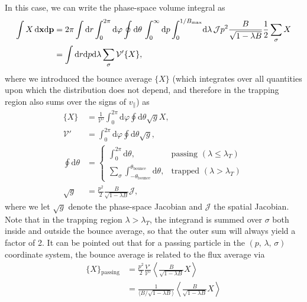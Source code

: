 \documentclass[11pt,a4paper]{article}
\newcommand{\rd}{\ensuremath{\mathrm{d}}}
\newcommand{\sub}[1]{\ensuremath{_{\text{#1}}}}
\renewcommand{\b}[1]{\ensuremath{ {\bf #1 } }}
\begin{document}
In this case, we can write the phase-space volume integral as
\begin{align}
\int X \,\rd\b{x} \rd\b{p} &= 2\pi \int \rd r \int_0^{2\pi} \rd \varphi \oint \rd \theta \, \int_0^\infty \rd p \int_0^{1/B\sub{max}} \!\rd \lambda \, \mathcal{J}p^2\frac{B}{\sqrt{1-\lambda B}}\frac{1}{2}\sum_\sigma X \nonumber \\
&= \int \rd r \rd p \rd \lambda \sum_\sigma \mathcal{V}' \{ X \},
\end{align}
where we introduced the bounce average $\{X\}$ (which integrates over all quantities upon which the distribution does not depend, and therefore in the trapping region also sums over the signs of $v_\parallel$) as
\begin{align}
\{ X\} &= \frac{1}{\mathcal{V}'} \int_0^{2\pi} \rd \varphi \oint \rd \theta \sqrt{g}X, \nonumber \\
\mathcal{V}' &= \int_0^{2\pi} \rd \varphi \oint \rd \theta \sqrt{g}, \nonumber \\
\oint\rd\theta &= \begin{cases}
\int_0^{2\pi}\rd\theta, & \text{passing }(\lambda \leq \lambda_T)\\
\sum_\sigma \int_{-\theta\sub{bounce}}^{\theta\sub{bounce}} \rd\theta, & \text{trapped } (\lambda > \lambda_T)
\end{cases} \\
\sqrt{g} &= \frac{p^2}{2}\frac{B}{\sqrt{1-\lambda B}}\mathcal{J} ,
\end{align}
where we let $\sqrt{g}$ denote the phase-space Jacobian and $\mathcal{J}$ the spatial Jacobian. Note that in the trapping region $\lambda > \lambda_T$, the integrand is summed over $\sigma$ both inside and outside the bounce average, so that the outer sum will always yield a factor of 2.
It can be pointed out that for a passing particle in the $(p,\,\lambda,\,\sigma)$ coordinate system, the bounce average is related to the flux average via 
\begin{align}
\{X\}\sub{passing} &= \frac{p^2}{2}\frac{V'}{\mathcal{V}'}\left\langle \frac{B}{\sqrt{1-\lambda B}}X\right\rangle \nonumber \\
&= \frac{1}{\langle B/\sqrt{1-\lambda B} \rangle}\left\langle \frac{B}{\sqrt{1-\lambda B}}X\right\rangle 
\end{align}
\end{document}
